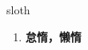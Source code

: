 
\begin{frame}
{\huge sloth}
\begin{center}
\begin{enumerate}\Large
  \item \textbf{怠惰，懒惰}
\end{enumerate}
\end{center}
\end{frame}
